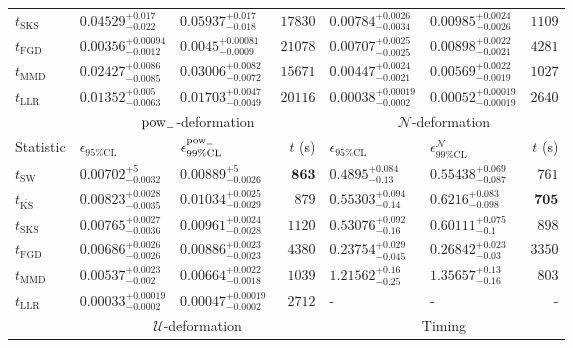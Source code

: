 \begin{tabular}{l|llr|llr}
	$t_{\mathrm{SKS}}$ & $0.04529_{-0.022}^{+0.017}$ & $0.05937_{-0.018}^{+0.017}$ & $17830$ & $0.00784_{-0.0034}^{+0.0026}$ & $0.00985_{-0.0026}^{+0.0024}$ & $1109$ \\
	$t_{\mathrm{FGD}}$ & ${\mathbf{0.00356_{-0.0012}^{+0.00094}}}$ & ${\mathbf{0.0045_{-0.0009}^{+0.00081}}}$ & $21078$ & $0.00707_{-0.0025}^{+0.0025}$ & $0.00898_{-0.0021}^{+0.0022}$ & $4281$ \\
	$t_{\mathrm{MMD}}$ & $0.02427_{-0.0085}^{+0.0086}$ & $0.03006_{-0.0072}^{+0.0082}$ & $15671$ & ${\mathbf{0.00447_{-0.0021}^{+0.0024}}}$ & ${\mathbf{0.00569_{-0.0019}^{+0.0022}}}$ & $1027$ \\
	$t_{\mathrm{LLR}}$ & $0.01352_{-0.0063}^{+0.005}$ & $0.01703_{-0.0049}^{+0.0047}$ & $20116$ & $0.00038_{-0.0002}^{+0.00019}$ & $0.00052_{-0.00019}^{+0.00019}$ & $2640$ \\
	\toprule
	\multicolumn{1}{c}{} & \multicolumn{3}{c}{$\rm{pow}_{-}$-deformation} & \multicolumn{3}{c}{$\mathcal{N}$-deformation} \\
	Statistic & $\epsilon_{95\%\mathrm{CL}}$ & $\epsilon^  {\rm{pow}_{-}}_{99\%\mathrm{CL}}$ & $t$ (s) & $\epsilon_{95\%\mathrm{CL}}$ & $\epsilon^    {\mathcal{N}}_{99\%\mathrm{CL}}$ & $t$ (s) \\
	\midrule
	$t_{\mathrm{SW}}$ & $0.00702_{-0.0032}^{+5}$ & $0.00889_{-0.0026}^{+5}$ & ${\mathbf{863}}$ & $0.4895_{-0.13}^{+0.084}$ & $0.55438_{-0.087}^{+0.069}$ & $761$ \\
	$t_{\overline{\mathrm{KS}}}$ & $0.00823_{-0.0035}^{+0.0028}$ & $0.01034_{-0.0029}^{+0.0025}$ & $879$ & $0.55303_{-0.14}^{+0.094}$ & $0.6216_{-0.098}^{+0.083}$ & ${\mathbf{705}}$ \\
	$t_{\mathrm{SKS}}$ & $0.00765_{-0.0036}^{+0.0027}$ & $0.00961_{-0.0028}^{+0.0024}$ & $1120$ & $0.53076_{-0.16}^{+0.092}$ & $0.60111_{-0.1}^{+0.075}$ & $898$ \\
	$t_{\mathrm{FGD}}$ & $0.00686_{-0.0026}^{+0.0026}$ & $0.00886_{-0.0023}^{+0.0023}$ & $4380$ & ${\mathbf{0.23754_{-0.045}^{+0.029}}}$ & ${\mathbf{0.26842_{-0.03}^{+0.023}}}$ & $3350$ \\
	$t_{\mathrm{MMD}}$ & ${\mathbf{0.00537_{-0.002}^{+0.0023}}}$ & ${\mathbf{0.00664_{-0.0018}^{+0.0022}}}$ & $1039$ & $1.21562_{-0.25}^{+0.16}$ & $1.35657_{-0.16}^{+0.13}$ & $803$ \\
	$t_{\mathrm{LLR}}$ & $0.00033_{-0.0002}^{+0.00019}$ & $0.00047_{-0.0002}^{+0.00019}$ & $2712$ & - & - & - \\
	\toprule
	\multicolumn{1}{c}{} & \multicolumn{3}{c}{$\mathcal{U}$-deformation} & \multicolumn{3}{c}{Timing} \\

\end{tabular}
